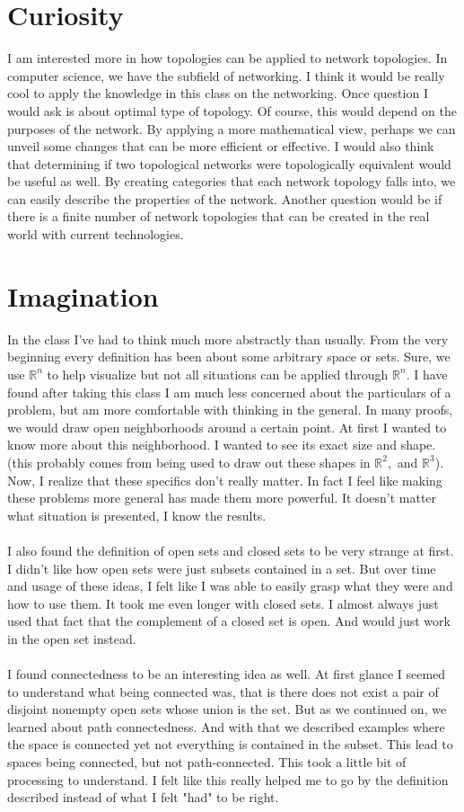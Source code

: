 \documentclass[12pt]{article}
\newcommand{\R}{\mathbb{R}}
\newcommand{\1}{^{-1}}
\begin{document}
	\section{Curiosity}
	I am interested more in how topologies can be applied to network topologies. In computer science, we have the subfield of networking. I think it would be really cool to apply the knowledge in this class on the networking. Once question I would ask is about optimal type of topology. Of course, this would depend on the purposes of the network. By applying a more mathematical view, perhaps we can unveil some changes that can be more efficient or effective. I would also think that determining if two topological networks were topologically equivalent would be useful as well. By creating categories that each network topology falls into, we can easily describe the properties of the network. Another question would be if there is a finite number of network topologies that can be created in the real world with current technologies.
	\section{Imagination}
	In the class I've had to think much more abstractly than usually. From the very beginning every definition has been about some arbitrary space or sets. Sure, we use $ \R^n $ to help visualize but not all situations can be applied through $ \R^n $. I have found after taking this class I am much less concerned about the particulars of a problem, but am more comfortable with thinking in the general. In many proofs, we would draw open neighborhoods around a certain point. At first I wanted to know more about this neighborhood. I wanted to see its exact size and shape. (this probably comes from being used to draw out these shapes in $ \R^2,$ and $ \R^3 $). Now, I realize that these specifics don't really matter. In fact I feel like making these problems more general has made them more powerful. It doesn't matter what situation is presented, I know the results.\\
	\\
	I also found the definition of open sets and closed sets to be very strange at first. I didn't like how open sets were just subsets contained in a set. But over time and usage of these ideas, I felt like I was able to easily grasp what they were and how to use them. It took me even longer with closed sets. I almost always just used that fact that the complement of a closed set is open. And would just work in the open set instead.\\
	\\
	I found connectedness to be an interesting idea as well. At first glance I seemed to understand what being connected was, that is there does not exist a pair of disjoint nonempty open sets whose union is the set. But as we continued on, we learned about path connectedness. And with that we described examples where the space is connected yet not everything is contained in the subset. This lead to spaces being connected, but not path-connected. This took a little bit of processing to understand. I felt like this really helped me to go by the definition described instead of what I felt "had" to be right. 
\end{document}
